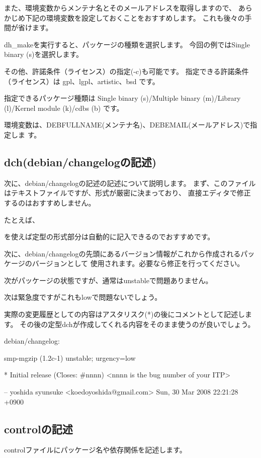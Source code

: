 \documentclass[mingoth,a4paper]{jsarticle}
\begin{document}
また、環境変数からメンテナ名とそのメールアドレスを取得しますので、
あらかじめ下記の環境変数を設定しておくことをおすすめします。
これも後々の手間が省けます。

dh\_makeを実行すると、パッケージの種類を選択します。
今回の例ではSingle binary (s)を選択します。

その他、許諾条件（ライセンス）の指定(-c)も可能です。
指定できる許諾条件（ライセンス）は gpl、lgpl、artistic、bsd です。

指定できるパッケージ種類は
Single binary (s)/Multiple binary (m)/Library (l)/Kernel module (k)/cdbs
(b) です。

環境変数は、DEBFULLNAME(メンテナ名)、DEBEMAIL(メールアドレス)で指定しま
す。

\subsection{dch(debian/changelogの記述)}

次に、debian/changelogの記述の記述について説明します。
まず、このファイルはテキストファイルですが、形式が厳密に決まっており、
直接エディタで修正するのはおすすめしません。

たとえば、
を使えば定型の形式部分は自動的に記入できるのでおすすめです。

次に、debian/changelogの先頭にあるバージョン情報がこれから作成されるパッケージのバージョンとして
使用されます。必要なら修正を行ってください。

次がパッケージの状態ですが、通常はunstableで問題ありません。

次は緊急度ですがこれもlowで問題ないでしょう。

実際の変更履歴としての内容はアスタリスク(*)の後にコメントとして記述します。
その後の定型dchが作成してくれる内容をそのまま使うのが良いでしょう。

debian/changelog:
\begin{commandline}
 smp-mgzip (1.2c-1) unstable; urgency=low

  * Initial release (Closes: #nnnn)  <nnnn is the bug number of your ITP>

 -- yoshida syunsuke <koedoyoshida@gmail.com>  Sun, 30 Mar 2008 22:21:28 +0900
\end{commandline}


\subsection{controlの記述}
controlファイルにパッケージ名や依存関係を記述します。
\end{document}
